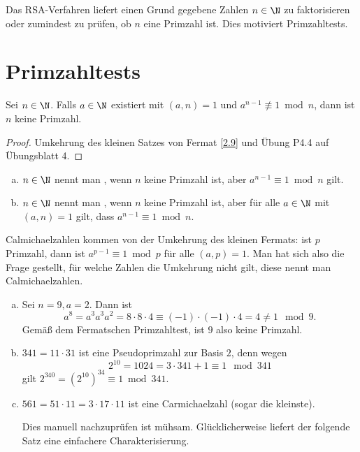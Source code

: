 Das RSA-Verfahren liefert einen Grund gegebene Zahlen $n \in \N$ zu faktorisieren oder zumindest zu prüfen, ob $n$ eine Primzahl ist.
Dies motiviert Primzahltests.

\section{Primzahltests}

\begin{prop} \label{3.5}
	Sei $n \in \N$.
	Falls $a \in \N$ existiert mit $(a,n) = 1$ und $a^{n-1} \not\equiv 1 \bmod n$, dann ist $n$ keine Primzahl.
	\begin{proof}
		Umkehrung des kleinen Satzes von Fermat \ref{2.9} und Übung P4.4 auf Übungsblatt 4.
	\end{proof}
\end{prop}

\begin{df} \label{3.6}
	\begin{enumerate}[a)]
		\item
			$n \in \N$ nennt man , wenn $n$ keine Primzahl ist, aber $a^{n-1} \equiv 1 \bmod n$ gilt.
		\item
			$n \in \N$ nennt man , wenn $n$ keine Primzahl ist, aber für alle $a \in \N$ mit $(a,n) = 1$ gilt, dass $a^{n-1} \equiv 1 \bmod n$.
	\end{enumerate}
	\begin{note}
		Calmichaelzahlen  kommen von der Umkehrung des kleinen Fermats: ist $p$ Primzahl, dann ist $a^{p-1} \equiv 1 \bmod p$ für alle $(a,p) = 1$.
		Man hat sich also die Frage gestellt, für welche Zahlen die Umkehrung nicht gilt, diese nennt man Calmichaelzahlen.
	\end{note}
\end{df}

\begin{ex} \label{3.7}
	\begin{enumerate}[a)]
		\item
			Sei $n = 9, a = 2$.
			Dann ist
			\[
				a^8
				= a^3 a^3 a^2
				= 8 \cdot 8 \cdot 4
				\equiv (-1) \cdot (-1) \cdot 4
				= 4
				\neq 1
				\mod 9.
			\]
			Gemäß dem Fermatschen Primzahltest, ist $9$ also keine Primzahl.
		\item
			$341 = 11 \cdot 31$ ist eine Pseudoprimzahl zur Basis $2$, denn wegen
			\[
				2^{10} = 1024 = 3\cdot 341 + 1
				\equiv 1 \mod 341
			\]
			gilt $2^{340} = (2^{10})^{34} \equiv 1 \bmod 341$.
		\item
			$561 = 51 \cdot 11 = 3 \cdot 17 \cdot 11$ ist eine Carmichaelzahl (sogar die kleinste).

			Dies manuell nachzuprüfen ist mühsam.
			Glücklicherweise liefert der folgende Satz eine einfachere Charakterisierung.
	\end{enumerate}
\end{ex}


